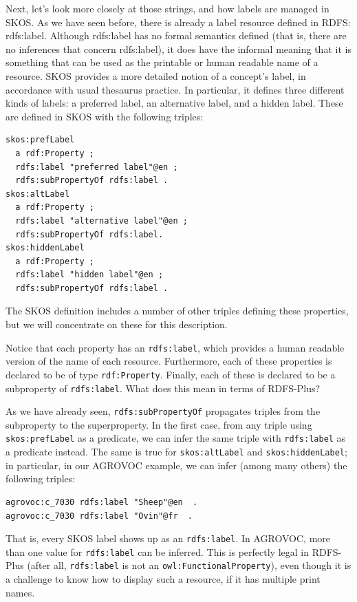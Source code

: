 Next, let's look more closely at those strings, and how labels are
managed in SKOS. As we have seen before, there is already a label
resource defined in RDFS: rdfs:label. Although rdfs:label has no formal
semantics defined (that is, there are no inferences that concern
rdfs:label), it does have the informal meaning that it is something that
can be used as the printable or human readable name of a resource. SKOS
provides a more detailed notion of a concept's label, in accordance with
usual thesaurus practice. In particular, it defines three different
kinds of labels: a preferred label, an alternative label, and a hidden
label. These are defined in SKOS with the following triples:

\begin{lstlisting}
skos:prefLabel
  a rdf:Property ;
  rdfs:label "preferred label"@en ;
  rdfs:subPropertyOf rdfs:label .
skos:altLabel
  a rdf:Property ;
  rdfs:label "alternative label"@en ;
  rdfs:subPropertyOf rdfs:label.
skos:hiddenLabel
  a rdf:Property ;
  rdfs:label "hidden label"@en ;
  rdfs:subPropertyOf rdfs:label .
\end{lstlisting}

The SKOS definition includes a number of other triples defining these
properties, but we will concentrate on these for this description.

Notice that each property has an \texttt{rdfs:label}, which provides a human
readable version of the name of each resource. Furthermore, each of
these properties is declared to be of type \texttt{rdf:Property}. Finally, each
of these is declared to be a subproperty of \texttt{rdfs:label}. What does this
mean in terms of RDFS-Plus?

As we have already seen, \texttt{rdfs:subPropertyOf} propagates triples from the
subproperty to the superproperty. In the first case, from any triple
using \texttt{skos:prefLabel} as a predicate, we can infer the same triple with
\texttt{rdfs:label} as a predicate instead. The same is true for \texttt{skos:altLabel}
and \texttt{skos:hiddenLabel}; in particular, in our AGROVOC example, we can
infer (among many others) the following triples:

\begin{lstlisting}
agrovoc:c_7030 rdfs:label "Sheep"@en  .
agrovoc:c_7030 rdfs:label "Ovin"@fr  .
\end{lstlisting}

That is, every SKOS label shows up as an \texttt{rdfs:label}. In AGROVOC, more
than one value for \texttt{rdfs:label} can be inferred. This is perfectly legal
in RDFS-Plus (after all, \texttt{rdfs:label} is not an \texttt{owl:FunctionalProperty}),
even though it is a challenge to know how to display such a resource, if
it has multiple print names.

